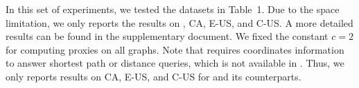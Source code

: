 In this set of experiments, we tested the datasets in Table~1. Due to the space limitation, we only reports the results on \dblpone, CA, E-US, and C-US. A more detailed results can be found in the supplementary document. We fixed the constant $c = 2$ for computing proxies on all graphs. Note that \ah requires coordinates information to answer shortest path or distance queries, which is not available in \dblpone. Thus, we only reports results on CA, E-US, and C-US for \ah and its counterparts.

